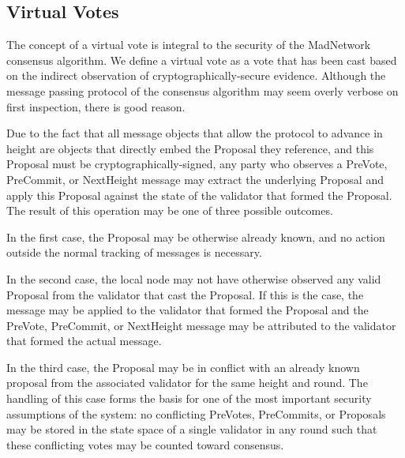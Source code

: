 \subsection{Virtual Votes}

The concept of a virtual vote is integral to the security of the
MadNetwork consensus algorithm.
We define a virtual vote as a vote that has been cast based on the
indirect observation of cryptographically-secure evidence.
Although the message passing protocol of the consensus algorithm may
seem overly verbose on first inspection, there is good reason.

Due to the fact that all message objects that allow the protocol to
advance in height are objects that directly embed the Proposal they
reference, and this Proposal must be cryptographically-signed, any
party who observes a PreVote, PreCommit, or NextHeight message may
extract the underlying Proposal and apply this Proposal against the
state of the validator that formed the Proposal.
The result of this operation may be one of three possible outcomes.

In the first case, the Proposal may be otherwise already known, and no
action outside the normal tracking of messages is necessary.

In the second case, the local node may not have otherwise observed any
valid Proposal from the validator that cast the Proposal.
If this is the case, the message may be applied to the validator that
formed the Proposal and the PreVote, PreCommit, or NextHeight message
may be attributed to the validator that formed the actual message.

In the third case, the Proposal may be in conflict with an already
known proposal from the associated validator for the same height and
round.
The handling of this case forms the basis for one of the most important
security assumptions of the system: no conflicting PreVotes,
PreCommits, or Proposals may be stored in the state space of a single
validator in any round such that these conflicting votes may be counted
toward consensus.

